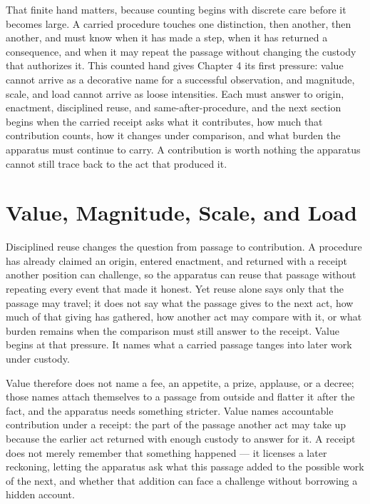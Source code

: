 That finite hand matters, because counting begins with discrete care before it becomes large. A carried procedure touches one distinction, then another, then another, and must know when it has made a step, when it has returned a consequence, and when it may repeat the passage without changing the custody that authorizes it. This counted hand gives Chapter 4 its first pressure: value cannot arrive as a decorative name for a successful observation, and magnitude, scale, and load cannot arrive as loose intensities. Each must answer to origin, enactment, disciplined reuse, and same-after-procedure, and the next section begins when the carried receipt asks what it contributes, how much that contribution counts, how it changes under comparison, and what burden the apparatus must continue to carry. A contribution is worth nothing the apparatus cannot still trace back to the act that produced it.

\section{Value, Magnitude, Scale, and Load}

Disciplined reuse changes the question from passage to contribution. A procedure has already claimed an origin, entered enactment, and returned with a receipt another position can challenge, so the apparatus can reuse that passage without repeating every event that made it honest. Yet reuse alone says only that the passage may travel; it does not say what the passage gives to the next act, how much of that giving has gathered, how another act may compare with it, or what burden remains when the comparison must still answer to the receipt. Value begins at that pressure. It names what a carried passage tanges into later work under custody.

Value therefore does not name a fee, an appetite, a prize, applause, or a decree; those names attach themselves to a passage from outside and flatter it after the fact, and the apparatus needs something stricter. Value names accountable contribution under a receipt: the part of the passage another act may take up because the earlier act returned with enough custody to answer for it. A receipt does not merely remember that something happened --- it licenses a later reckoning, letting the apparatus ask what this passage added to the possible work of the next, and whether that addition can face a challenge without borrowing a hidden account.

